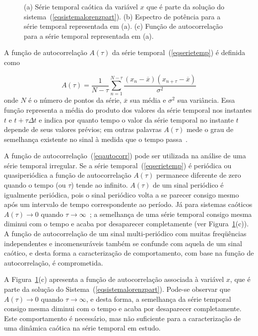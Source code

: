 \begin{figure}[ht]
\caption{(a) Série temporal caótica da variável $x$ que é parte da solução do sistema~(\ref{eqsistemalorenzpart}). (b) Espectro de potência para a série temporal representada em (a). (c) Função de autocorrelação para a série temporal representada em (a).}
\label{lorenzespec}
\end{figure}

A função de autocorrelação $A(\tau)$ da série temporal~(\ref{eqserietemp}) é definida como

\begin{equation}
A(\tau)=\frac{1}{N-\tau}\sum_{n=1}^{N-\tau}\frac{\left(x_{n}-\overline{x}\right)\left(x_{n+\tau}-\overline{x}\right)}{\sigma^2}
\label{eqautocorr}
\end{equation}
onde $N$ é o número de pontos da série, $\overline{x}$ sua média e $\sigma^2$ sua variância. Essa função representa a média do produto dos valores da série temporal nos instantes $t$ e $t+\tau\Delta t$ e indica por quanto tempo o valor da série temporal no instante $t$ depende de seus valores prévios; em outras palavras $A(\tau)$ mede o grau de semelhança existente no sinal à medida que o tempo passa~\cite{gollub/98}. 

A função de autocorrelação~(\ref{eqautocorr}) pode ser utilizada na análise de uma série temporal irregular. Se a série temporal~(\ref{eqserietemp}) é periódica ou quasiperiódica a função de autocorrelação $A(\tau)$ permanece diferente de zero quando o tempo (ou $\tau$) tende ao infinito. $A(\tau)$ de um sinal periódico é igualmente periódica, pois o sinal periódico volta a se parecer consigo mesmo após um intervalo de tempo correspondente ao período. Já para sistemas caóticos $A(\tau)\rightarrow 0$ quando $\tau\rightarrow \infty$~\cite{argyris/94}; a semelhança de uma série temporal consigo mesma diminui com o tempo e acaba por desaparecer completamente (ver Figura~\ref{lorenzespec}(c)).
A função de autocorrelação de um sinal multi-periódico com muitas freqüências independentes e incomensuráveis também se confunde com aquela de um sinal caótico, e desta forma a caracterização de comportamento, com base na função de autocorrelação, é comprometida.

A Figura~\ref{lorenzespec}(c) apresenta a função de autocorrelação associada à variável $x$, que é parte da solução do Sistema~(\ref{eqsistemalorenzpart}). Pode-se observar que $A(\tau)\rightarrow 0$ quando $\tau\rightarrow \infty$, e desta forma, a semelhança da série temporal consigo mesma diminui com o tempo e acaba por desaparecer completamente. Este comportamento é necessário, mas não suficiente para a caracterização de uma dinâmica caótica na série temporal em estudo.

